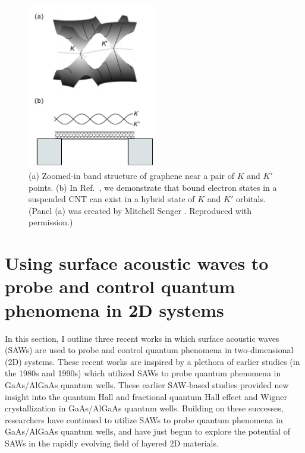 \documentclass{beavtex_dub_edit}
\begin{document}
\begin{figure}
    \includegraphics[width = 0.5\textwidth]{CNT intro fig}
    \caption{(a) Zoomed-in band structure of graphene near a pair of $K$ and $K'$ points. (b) In Ref.\ \cite{berg_vernier_2024}, we demonstrate that bound electron states in a suspended CNT can exist in a hybrid state of $K$ and $K'$ orbitals. (Panel (a) was created by Mitchell Senger \cite{senger_optoelectronics_2021}. Reproduced with permission.)}
    \label{CNT intro fig}
\end{figure}

\section[Using surface acoustic waves to probe and control quantum phenomena in 2D systems][Using SAWs to probe and control quantum phenomena in 2D systems]{Using surface acoustic waves to probe and control quantum phenomena in 2D systems} \label{using surface acoustic waves to probe and control quantum phenomena}

In this section, I outline three recent works in which surface acoustic waves (SAWs) are used to probe and control quantum phenomena in two-dimensional (2D) systems. These recent works are inspired by a plethora of earlier studies (in the 1980s and 1990s) which utilized SAWs to probe quantum phenomena in GaAs/AlGaAs quantum wells. These earlier SAW-based studies provided new insight into the quantum Hall and fractional quantum Hall effect \cite{wixforth_quantum_1986,esslinger_acoustoelectric_1992,esslinger_ultrasonic_1994,kukushkin_collective_2011,willett_experimental_1993} and Wigner crystallization \cite{paalanen_rf_1992} in GaAs/AlGaAs quantum wells. Building on these successes, researchers have continued to utilize SAWs to probe quantum phenomena in GaAs/AlGaAs quantum wells, and have just begun to explore the potential of SAWs in the rapidly evolving field of layered 2D materials.
\end{document}
